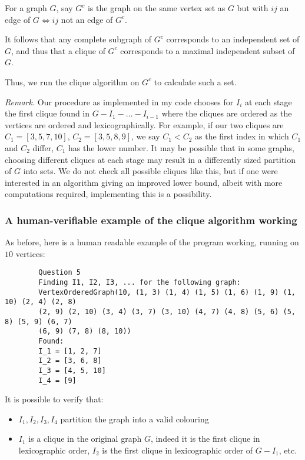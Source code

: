 \documentclass{article}
\begin{document}
For a graph $G$, say $G^c$ is the graph on the same vertex set as $G$ but with $ij$ an edge of $G \iff ij$ not an edge of $G^c$.

It follows that any complete subgraph of $G^c$ corresponds to an independent set of $G$, and thus that a clique of $G^c$ corresponds to a maximal independent subset of $G$.

Thus, we run the clique algorithm on $G^c$ to calculate such a set.


\emph{Remark.} Our procedure as implemented in my code chooses for $I_i$ at each stage the first clique found in $G - I_1 - \dots - I_{i-1}$ where the cliques are ordered as the vertices are ordered and lexicographically. For example, if our two cliques are $C_1 = [3,5,7,10]$, $C_2 = [3,5,8,9]$, we say $C_1 < C_2$ as the first index in which $C_1$ and $C_2$ differ, $C_1$ has the lower number. It may be possible that in some graphs, choosing different cliques at each stage may result in a differently sized partition of $G$ into sets. We do not check all possible cliques like this, but if one were interested in an algorithm giving an improved lower bound, albeit with more computations required, implementing this is a possibility.

\subsubsection{A human-verifiable example of the clique algorithm working}

As before, here is a human readable example of the program working, running on $10$ vertices:

\begin{tcolorbox}[size=small]
	\begin{verbatim}
		Question 5
		Finding I1, I2, I3, ... for the following graph:
		VertexOrderedGraph(10, (1, 3) (1, 4) (1, 5) (1, 6) (1, 9) (1, 10) (2, 4) (2, 8)
		(2, 9) (2, 10) (3, 4) (3, 7) (3, 10) (4, 7) (4, 8) (5, 6) (5, 8) (5, 9) (6, 7)
		(6, 9) (7, 8) (8, 10))
		Found:
		I_1 = [1, 2, 7]
		I_2 = [3, 6, 8]
		I_3 = [4, 5, 10]
		I_4 = [9]
	\end{verbatim}
\end{tcolorbox}

It is possible to verify that:

\begin{itemize}
	\item $I_1, I_2, I_3, I_4$ partition the graph into a valid colouring
	\item $I_1$ is a clique in the original graph $G$, indeed it is the first clique in lexicographic order, $I_2$ is the first clique in lexicographic order of $G-I_1$, etc.
 \end{itemize}
 
\end{document}
